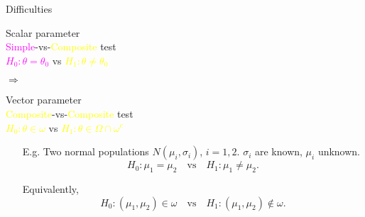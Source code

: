\begin{frame}
\begin{center}
Difficulties
\mySeparateLine

\begin{minipage}{0.4\textwidth}
\begin{center}
Scalar parameter\\[1em]
\textcolor{magenta}{Simple}-vs-\textcolor{yellow}{Composite} test\\
\textcolor{magenta}{$H_0:\theta=\theta_0$} vs \textcolor{yellow}{$H_1:\theta\ne \theta_0$}
\end{center}
\end{minipage}
\hfill
$\Rightarrow$
\hfill
\begin{minipage}{0.4\textwidth}
\begin{center}
	Vector parameter\\[1em]
	\textcolor{yellow}{Composite}-vs-\textcolor{yellow}{Composite} test\\
\textcolor{yellow}{$H_0:\theta\in\omega$} vs \textcolor{yellow}{$H_1:\theta\in \Omega\cap\omega^c$}
\end{center}
\end{minipage}
\mySeparateLine
\end{center}
\vfill
\pause

\begin{minipage}{0.65\textwidth}
\begin{itemize}
	\item[E.g.] Two normal populations $N(\mu_i,\sigma_i)$, $i=1,2$. $\sigma_i$ are known, $\mu_i$ unknown.
		\[
			H_0: \mu_1=\mu_2\quad\text{vs}\quad
			H_1:\mu_1\ne\mu_2.
		\]
		\item[] Equivalently,
		\[
			H_0: (\mu_1,\mu_2)\in \omega \quad\text{vs}\quad
			H_1:(\mu_1,\mu_2)\not\in \omega.
		\]
\end{itemize}
\end{minipage}
\hfill
\begin{minipage}{0.33\textwidth}
\vspace{-2em}
\end{minipage}
\end{frame}

